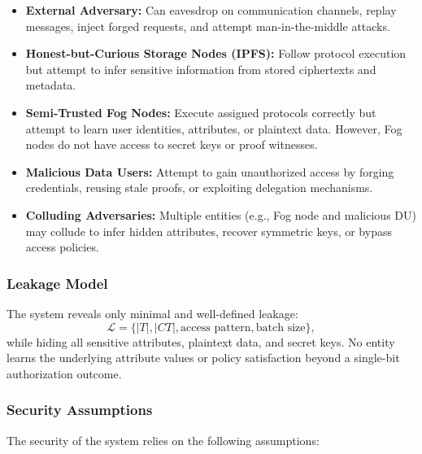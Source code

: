 \documentclass[conference]{IEEEtran}
\begin{document}
\begin{itemize}

\item \textbf{External Adversary:}  
Can eavesdrop on communication channels, replay messages, inject forged requests, and attempt man-in-the-middle attacks.

\item \textbf{Honest-but-Curious Storage Nodes (IPFS):}  
Follow protocol execution but attempt to infer sensitive information from stored ciphertexts and metadata.

\item \textbf{Semi-Trusted Fog Nodes:}  
Execute assigned protocols correctly but attempt to learn user identities, attributes, or plaintext data. However, Fog nodes do not have access to secret keys or proof witnesses.

\item \textbf{Malicious Data Users:}  
Attempt to gain unauthorized access by forging credentials, reusing stale proofs, or exploiting delegation mechanisms.

\item \textbf{Colluding Adversaries:}  
Multiple entities (e.g., Fog node and malicious DU) may collude to infer hidden attributes, recover symmetric keys, or bypass access policies.

\end{itemize}

\subsubsection{Leakage Model}

The system reveals only minimal and well-defined leakage:
\[
\mathcal{L} = \{ |T|, |CT|, \text{access pattern}, \text{batch size} \},
\]
while hiding all sensitive attributes, plaintext data, and secret keys. No entity learns the underlying attribute values or policy satisfaction beyond a single-bit authorization outcome.

\subsubsection{Security Assumptions}

The security of the system relies on the following assumptions:
\end{document}
